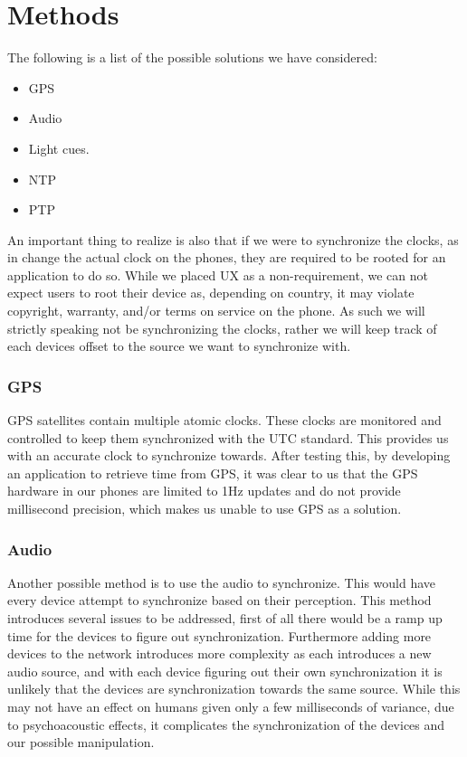 \section{Methods}
The following is a list of the possible solutions we have considered:
\begin{itemize}
    \item GPS
    \item Audio
    \item Light cues.
    \item \ac{NTP}
    \item \ac{PTP}
\end{itemize}
An important thing to realize is also that if we were to synchronize the clocks, as in change the actual clock on the phones, they are required to be rooted for an application to do so.
While we placed \ac{UX} as a non-requirement, we can not expect users to root their device as, depending on country, it may violate copyright, warranty, and/or terms on service on the phone.
As such we will strictly speaking not be synchronizing the clocks, rather we will keep track of each devices offset to the source we want to synchronize with.

\subsubsection{GPS}
GPS satellites contain multiple atomic clocks.
These clocks are monitored and controlled to keep them synchronized with the UTC standard.
This provides us with an accurate clock to synchronize towards.\cite{gpsclock}
After testing this, by developing an application to retrieve time from GPS, it was clear to us that the GPS hardware in our phones are limited to 1Hz updates and do not provide millisecond precision, which makes us unable to use GPS as a solution.

\subsubsection{Audio}
Another possible method is to use the audio to synchronize.
This would have every device attempt to synchronize based on their perception.
This method introduces several issues to be addressed, first of all there would be a ramp up time for the devices to figure out synchronization.
Furthermore adding more devices to the network introduces more complexity as each introduces a new audio source, and with each device figuring out their own synchronization it is unlikely that the devices are synchronization towards the same source.
While this may not have an effect on humans given only a few milliseconds of variance, due to psychoacoustic effects, it complicates the synchronization of the devices and our possible manipulation.

